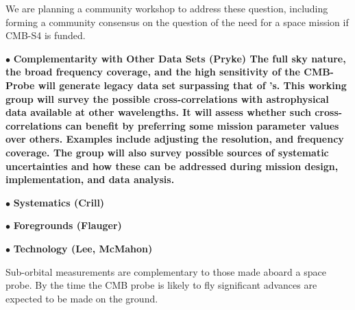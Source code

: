 We are planning a community workshop to address these question, including forming a community consensus on the 
question of the need for a space mission if CMB-S4 is funded. 

$\bullet$ \bf {Complementarity with Other Data Sets (Pryke)} \hspace{0.1in}
The full sky nature, the broad frequency coverage, and the high sensitivity of the CMB-Probe will generate legacy 
data set surpassing that of \planck 's. This working group will survey the possible cross-correlations with astrophysical 
data available at other wavelengths. It will assess whether such cross-correlations can benefit by preferring 
some mission parameter values over others. Examples include adjusting the resolution, and frequency coverage. 
The group will also survey possible sources of systematic uncertainties and how these can be addressed during mission 
design, implementation, and data analysis. 

$\bullet$ \bf {Systematics (Crill)} \hspace{0.1in}

$\bullet$ \bf {Foregrounds (Flauger) } \hspace{0.1in}

$\bullet$ \bf {Technology (Lee, McMahon)} \hspace{0.1in}


Sub-orbital measurements are complementary to those made aboard a space probe. By the time the \ac{CMB} probe is likely to fly significant advances are expected to be made on the ground. 

